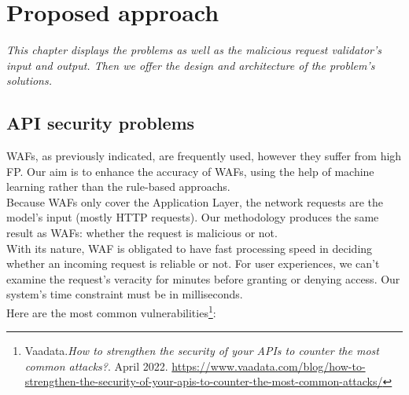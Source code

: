 \chapter{Proposed approach}
\label{chap:proposed_approach}
	\textit{This chapter displays the problems as well as the malicious request validator's input and output. Then we offer the design and architecture of the problem's solutions.}
\minitoc

\section{API security problems}
\label{API problems}
WAFs, as previously indicated, are frequently used, however they suffer from high FP. Our aim is to enhance the accuracy of WAFs, using the help of machine learning rather than the rule-based approachs.  \\
Because WAFs only cover the Application Layer, the network requests are the model's input (mostly HTTP requests). Our methodology produces the same result as WAFs: whether the request is malicious or not.\\
With its nature, WAF is obligated to have fast processing speed in deciding whether an incoming request is reliable or not. For user experiences, we can't examine the request's veracity for minutes before granting or denying access. Our system's time constraint must be in milliseconds.\\
Here are the most common vulnerabilities\footnote{Vaadata.\textit{How to strengthen the security of your APIs to counter the most common attacks?}. April 2022.
\url{https://www.vaadata.com/blog/how-to-strengthen-the-security-of-your-apis-to-counter-the-most-common-attacks/}}:

